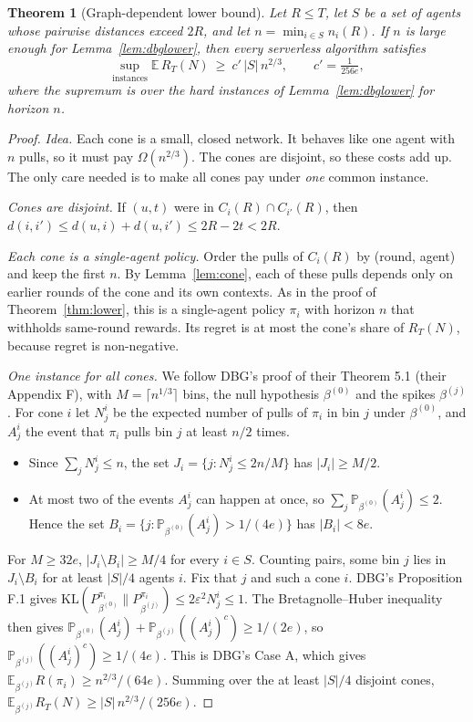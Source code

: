 \documentclass[11pt]{article}
\newtheorem{theorem}{Theorem}
\theoremstyle{definition}
\newcommand{\E}{\mathbb{E}}
\newcommand{\Prob}{\mathbb{P}}
\begin{document}
\begin{theorem}[Graph-dependent lower bound]\label{thm:conelower}
Let $R\le T$, let $S$ be a set of agents whose pairwise distances exceed $2R$, and let $n=\min_{i\in S}n_i(R)$. If $n$
is large enough for Lemma~\ref{lem:dbglower}, then every serverless algorithm satisfies
\[
\sup_{\text{instances}}\E\,R_T(N)\ \ge\ c'\,|S|\,n^{2/3},\qquad c'=\tfrac{1}{256e},
\]
where the supremum is over the hard instances of Lemma~\ref{lem:dbglower} for horizon $n$.
\end{theorem}
\begin{proof}
\emph{Idea.} Each cone is a small, closed network. It behaves like one agent with $n$ pulls, so it must pay
$\Omega(n^{2/3})$. The cones are disjoint, so these costs add up. The only care needed is to make all cones pay under
\emph{one} common instance.

\emph{Cones are disjoint.} If $(u,t)$ were in $C_i(R)\cap C_{i'}(R)$, then
$d(i,i')\le d(u,i)+d(u,i')\le2R-2t<2R$.

\emph{Each cone is a single-agent policy.} Order the pulls of $C_i(R)$ by (round, agent) and keep the first $n$. By
Lemma~\ref{lem:cone}, each of these pulls depends only on earlier rounds of the cone and its own contexts. As in
the proof of Theorem~\ref{thm:lower}, this is a single-agent policy $\pi_i$ with horizon $n$ that withholds same-round
rewards. Its regret is at most the cone's share of $R_T(N)$, because regret is non-negative.

\emph{One instance for all cones.} We follow DBG's proof of their Theorem 5.1 (their Appendix F), with $M=\lceil n^{1/3}\rceil$
bins, the null hypothesis $\beta^{(0)}$ and the spikes $\beta^{(j)}$. For cone $i$ let $N^i_j$ be the expected number of
pulls of $\pi_i$ in bin $j$ under $\beta^{(0)}$, and $A^i_j$ the event that $\pi_i$ pulls bin $j$ at least $n/2$ times.
\begin{itemize}[nosep]
\item Since $\sum_jN^i_j\le n$, the set $J_i=\{j:N^i_j\le2n/M\}$ has $|J_i|\ge M/2$.
\item At most two of the events $A^i_j$ can happen at once, so $\sum_j\Prob_{\beta^{(0)}}(A^i_j)\le2$. Hence the set
$B_i=\{j:\Prob_{\beta^{(0)}}(A^i_j)>1/(4e)\}$ has $|B_i|<8e$.
\end{itemize}
For $M\ge32e$, $|J_i\setminus B_i|\ge M/4$ for every $i\in S$. Counting pairs, some bin $j$ lies in $J_i\setminus B_i$ for at
least $|S|/4$ agents $i$. Fix that $j$ and such a cone $i$. DBG's Proposition F.1 gives
$\mathrm{KL}(P^{\pi_i}_{\beta^{(0)}}\|P^{\pi_i}_{\beta^{(j)}})\le2\varepsilon^2N^i_j\le1$. The Bretagnolle--Huber inequality then gives
$\Prob_{\beta^{(0)}}(A^i_j)+\Prob_{\beta^{(j)}}((A^i_j)^c)\ge1/(2e)$, so $\Prob_{\beta^{(j)}}((A^i_j)^c)\ge1/(4e)$. This is DBG's
Case A, which gives $\E_{\beta^{(j)}}R(\pi_i)\ge n^{2/3}/(64e)$. Summing over the at least $|S|/4$ disjoint cones,
$\E_{\beta^{(j)}}R_T(N)\ge|S|\,n^{2/3}/(256e)$.
\end{proof}
\end{document}
